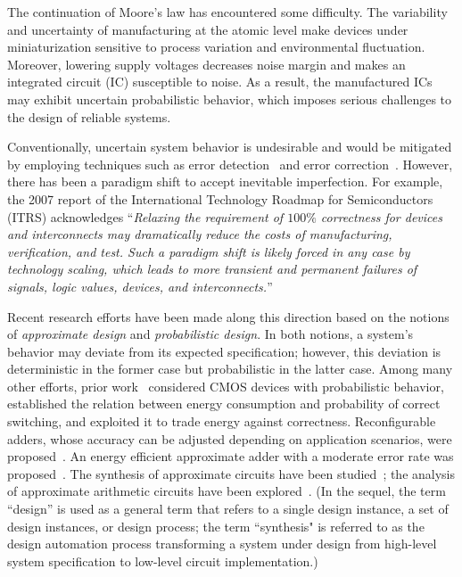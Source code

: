     The continuation of Moore's law has encountered some difficulty.
    The variability and uncertainty of manufacturing at the atomic level make devices under miniaturization sensitive to process variation and environmental fluctuation.
    Moreover, lowering supply voltages decreases noise margin and makes an integrated circuit (IC) susceptible to noise.
    As a result, the manufactured ICs may exhibit uncertain probabilistic behavior,
    which imposes serious challenges to the design of reliable systems.

    Conventionally, uncertain system behavior is undesirable and would be mitigated by employing techniques such as error detection~\cite{Constantinescu2003} and error correction~\cite{Mitra2006}.
    However, there has been a paradigm shift to accept inevitable imperfection.
    For example, the 2007 report of the International Technology Roadmap for Semiconductors (ITRS)
    acknowledges
    ``\textit{Relaxing the requirement of $100\%$ correctness for devices and interconnects may dramatically reduce the costs of manufacturing, verification, and test.
        Such a paradigm shift is likely forced in any case by technology scaling, which leads to more transient and permanent failures of signals, logic values, devices, and interconnects.}''

    Recent research efforts have been made along this direction based
    on the notions of \textit{approximate design} and \textit{probabilistic design}.
    In both notions, a system's behavior may deviate from its expected specification;
    however, this deviation is deterministic in the former case but probabilistic in the latter case.
    Among many other efforts, prior work~\cite{Chakrapani2006ProbDesign} considered CMOS devices with probabilistic behavior, established the relation between energy consumption and probability of correct switching, and exploited it to trade energy against correctness.
    Reconfigurable adders, whose accuracy can be adjusted depending on application scenarios, were proposed~\cite{Kahng2012,Ye2013}.
    An energy efficient approximate adder with a moderate error rate was proposed~\cite{Kim2013}.
    The synthesis of approximate circuits have been studied~\cite{Venkatesan2011ApproxDesign,Venkataramani2012,Miao2013,Miao2014};
    the analysis of approximate arithmetic circuits have been explored~\cite{Li2014,Mrazek2016,Rehman2016}.
    (In the sequel, the term ``design'' is used as a general term that refers to a single design instance, a set of design instances, or design process;
    the term ``synthesis" is referred to as the design automation process transforming a system under design from high-level system specification to low-level circuit implementation.)

